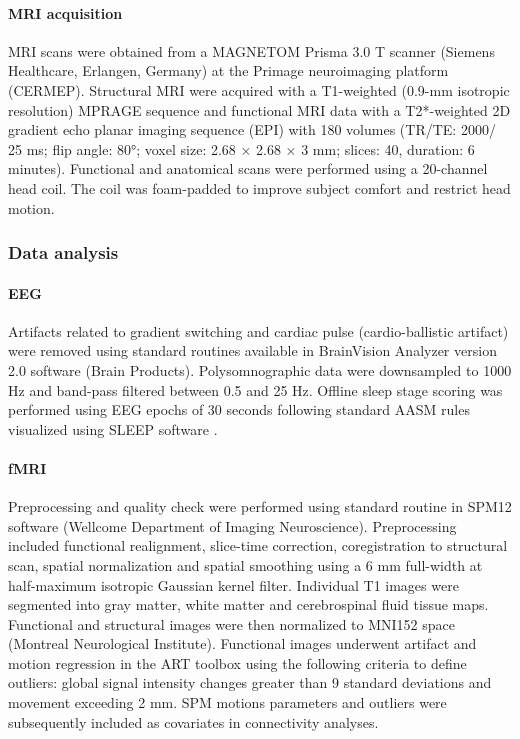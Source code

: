 \paragraph{MRI acquisition}
MRI scans were obtained from a MAGNETOM Prisma 3.0 T scanner (Siemens Healthcare, Erlangen, Germany) at the Primage neuroimaging platform (CERMEP). Structural MRI were acquired with a T1-weighted (0.9-mm isotropic resolution) MPRAGE sequence and functional MRI data with a T2*-weighted 2D gradient echo planar imaging sequence (EPI) with 180 volumes (TR/TE: 2000/ 25 ms; flip angle: 80°; voxel size: 2.68 × 2.68 × 3 mm; slices: 40, duration: 6 minutes). Functional and anatomical scans were performed using a 20-channel head coil. The coil was foam-padded to improve subject comfort and restrict head motion.

\subsubsection*{Data analysis}
\paragraph{EEG}
Artifacts related to gradient switching and cardiac pulse (cardio-ballistic artifact) were removed using standard routines available in BrainVision Analyzer version 2.0 software (Brain Products). Polysomnographic data were downsampled to 1000 Hz and band-pass filtered between 0.5 and 25 Hz. Offline sleep stage scoring was performed using EEG epochs of 30 seconds following standard AASM rules \citep{iber_aasm_2007} visualized using SLEEP software \citep{combrisson_sleep:_2017}.

\paragraph{fMRI}
Preprocessing and quality check were performed using standard routine in SPM12 software (Wellcome Department of Imaging Neuroscience). Preprocessing included functional realignment, slice-time correction, coregistration to structural scan, spatial normalization and spatial smoothing using a 6 mm full-width at half-maximum isotropic Gaussian kernel filter. Individual T1 images were segmented into gray matter, white matter and cerebrospinal fluid tissue maps. Functional and structural images were then normalized to MNI152 space (Montreal Neurological Institute). Functional images underwent artifact and motion regression in the ART toolbox using the following criteria to define outliers: global signal intensity changes greater than 9 standard deviations and movement exceeding 2 mm. SPM motions parameters and outliers were subsequently included as covariates in connectivity analyses.

